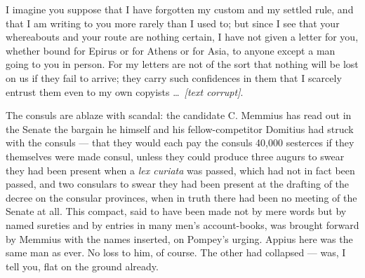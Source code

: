 

 I imagine you suppose that I have forgotten my custom and my settled rule, and that I am writing to you more rarely than I used to; but since I see that your whereabouts and your route are nothing certain, I have not given a letter for you, whether bound for Epirus or for Athens or for Asia, to anyone except a man going to you in person. For my letters are not of the sort that nothing will be lost on us if they fail to arrive; they carry such confidences in them that I scarcely entrust them even to my own copyists \dots\ \textit{[text corrupt]}.

 The consuls are ablaze with scandal: the candidate C. Memmius has read out in the Senate the bargain he himself and his fellow-competitor Domitius had struck with the consuls --- that they would each pay the consuls 40,000 sesterces if they themselves were made consul, unless they could produce three augurs to swear they had been present when a \textit{lex curiata} was passed, which had not in fact been passed, and two consulars to swear they had been present at the drafting of the decree on the consular provinces, when in truth there had been no meeting of the Senate at all. This compact, said to have been made not by mere words but by named sureties and by entries in many men's account-books, was brought forward by Memmius with the names inserted, on Pompey's urging. Appius here was the same man as ever. No loss to him, of course. The other had collapsed --- was, I tell you, flat on the ground already.

